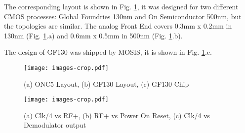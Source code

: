 The corresponding layout \cite{dali_man} is shown in Fig. \ref{fig:layout}, it was designed for two different CMOS processes: Global Foundries 130nm and On Semiconductor 500nm, but the topologies are similar. The analog Front End covers 0.3mm x 0.2mm in 130nm (Fig. \ref{fig:layout}.a) and 0.6mm x 0.5mm in 500nm (Fig. \ref{fig:layout}.b).

The design of GF130 was shipped by MOSIS, it is shown in Fig. \ref{fig:layout}.c. 

\begin{figure}[h]
  \centering
  \texttt{[image: images-crop.pdf]}
  \caption{(a) ONC5 Layout, (b) GF130 Layout, (c) GF130 Chip}
  \label{fig:layout}
\end{figure}


\begin{figure}[h]
  \centering
  \texttt{[image: images-crop.pdf]}
  \caption{(a) Clk/4 vs RF+, (b) RF+ vs Power On Reset, (c) Clk/4 vs Demodulator output}
  \label{fig:meas}
\end{figure}
